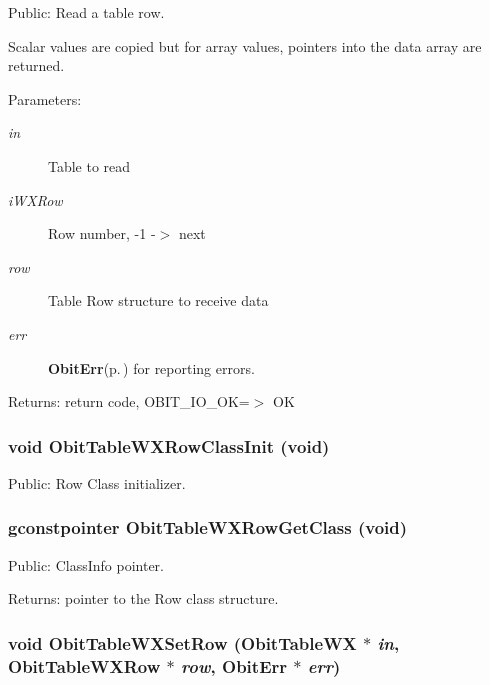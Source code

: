 Public: Read a table row. 

Scalar values are copied but for array values, pointers into the data array are returned. \begin{Desc}
\item[Parameters:]
\begin{description}
\item[{\em in}]Table to read \item[{\em i\-WXRow}]Row number, -1 -$>$ next \item[{\em row}]Table Row structure to receive data \item[{\em err}]{\bf Obit\-Err}{\rm (p.\,\pageref{structObitErr})} for reporting errors. \end{description}
\end{Desc}
\begin{Desc}
\item[Returns:]return code, OBIT\_\-IO\_\-OK=$>$ OK \end{Desc}
\subsubsection{\setlength{\rightskip}{0pt plus 5cm}void Obit\-Table\-WXRow\-Class\-Init (void)}\label{ObitTableWX_8h_a7}


Public: Row Class initializer. 

\subsubsection{\setlength{\rightskip}{0pt plus 5cm}gconstpointer Obit\-Table\-WXRow\-Get\-Class (void)}\label{ObitTableWX_8h_a9}


Public: Class\-Info pointer. 

\begin{Desc}
\item[Returns:]pointer to the Row class structure. \end{Desc}
\subsubsection{\setlength{\rightskip}{0pt plus 5cm}void Obit\-Table\-WXSet\-Row ({\bf Obit\-Table\-WX} $\ast$ {\em in}, {\bf Obit\-Table\-WXRow} $\ast$ {\em row}, {\bf Obit\-Err} $\ast$ {\em err})}\label{ObitTableWX_8h_a19}


